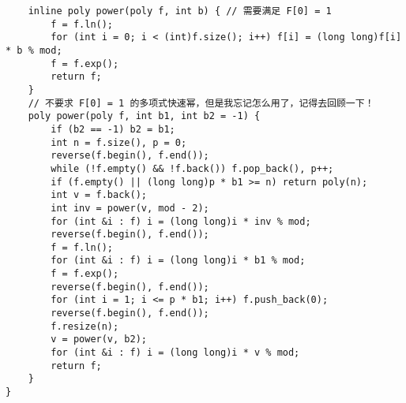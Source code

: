 \begin{verbatim}
    inline poly power(poly f, int b) { // 需要满足 F[0] = 1
        f = f.ln();
        for (int i = 0; i < (int)f.size(); i++) f[i] = (long long)f[i] * b % mod;
        f = f.exp();
        return f;
    }
    // 不要求 F[0] = 1 的多项式快速幂，但是我忘记怎么用了，记得去回顾一下！
    poly power(poly f, int b1, int b2 = -1) {
        if (b2 == -1) b2 = b1;
        int n = f.size(), p = 0;
        reverse(f.begin(), f.end());
        while (!f.empty() && !f.back()) f.pop_back(), p++;
        if (f.empty() || (long long)p * b1 >= n) return poly(n);
        int v = f.back();
        int inv = power(v, mod - 2);
        for (int &i : f) i = (long long)i * inv % mod;
        reverse(f.begin(), f.end());
        f = f.ln();
        for (int &i : f) i = (long long)i * b1 % mod;
        f = f.exp();
        reverse(f.begin(), f.end());
        for (int i = 1; i <= p * b1; i++) f.push_back(0);
        reverse(f.begin(), f.end());
        f.resize(n);
        v = power(v, b2);
        for (int &i : f) i = (long long)i * v % mod;
        return f;
    }
}
\end{verbatim}